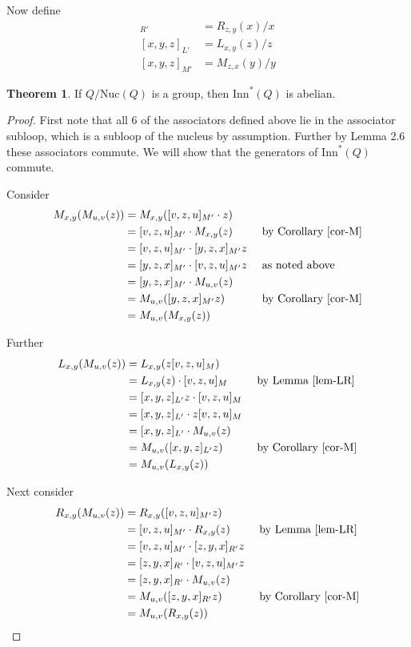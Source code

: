 \documentclass[12pt]{report}
\theoremstyle{definition}
\newtheorem{thm}{Theorem}[chapter]
\newcommand{\rdv}{/}                %
\newcommand{\nuc}{\text{Nuc}}       %
\newcommand{\inn}{\text{Inn}}       %
\begin{document}
Now define
  \begin{align*}
    [x, y, z]_{R'} &= R_{z, y}(x)\rdv x\\
    [x, y, z]_{L'} &= L_{x, y}(z)\rdv z\\
    [x, y, z]_{M'} &= M_{z, x}(y)\rdv y
  \end{align*}

\begin{thm}\label{inn*}
  If $Q/\nuc(Q)$ is a group, then $\inn^*(Q)$ is abelian.
\end{thm}

\begin{proof}
  First note that all 6 of the associators defined above lie in the associator subloop, which
    is a subloop of the nucleus by assumption. Further by \cite{PACC} Lemma 2.6 these associators
    commute. We will show that the generators of $\inn^*(Q)$ commute.

  Consider
  \begin{alignat*}{2}
    M_{x, y}(M_{u, v}(z)) &= M_{x, y}([v, z, u]_{M'}\cdot z) &&\\
    &= [v, z, u]_{M'}\cdot M_{x, y}(z) &&\text{ by Corollary \ref{cor-M}}\\
    &= [v, z, u]_{M'}\cdot [y, z, x]_{M'}z &&\\
    &= [y, z, x]_{M'}\cdot [v, z, u]_{M'}z &&\text{ as noted above}\\
    &= [y, z, x]_{M'}\cdot M_{u, v}(z) &&\\
    &= M_{u, v}([y, z, x]_{M'}z) &&\text{ by Corollary \ref{cor-M}}\\
    &= M_{u, v}(M_{x, y}(z))
  \end{alignat*}

  Further
  \begin{alignat*}{2}
    L_{x, y}(M_{u, v}(z)) &= L_{x, y}(z[v, z, u]_M) &&\\
    &= L_{x, y}(z)\cdot [v, z, u]_M &&\text{ by Lemma \ref{lem-LR}}\\
    &= [x, y, z]_{L'}z \cdot [v, z, u]_M &&\\
    &= [x, y, z]_{L'} \cdot z[v, z, u]_M &&\\
    &= [x, y, z]_{L'} \cdot M_{u, v}(z) &&\\
    &= M_{u, v}([x, y, z]_{L'} z) &&\text{ by Corollary \ref{cor-M}}\\
    &= M_{u, v}(L_{x, y}(z)) &&
  \end{alignat*}

  Next consider
  \begin{alignat*}{2}
    R_{x, y}(M_{u, v}(z)) &= R_{x, y}([v, z, u]_{M'}z) &&\\
    &= [v, z, u]_{M'}\cdot R_{x, y}(z) &&\text{ by Lemma \ref{lem-LR}}\\
    &= [v, z, u]_{M'}\cdot [z, y, x]_{R'}z &&\\
    &= [z, y, x]_{R'}\cdot [v, z, u]_{M'}z &&\\
    &= [z, y, x]_{R'}\cdot M_{u, v}(z) &&\\
    &= M_{u, v}([z, y, x]_{R'}z) &&\text{ by Corollary \ref{cor-M}}\\
    &= M_{u, v}(R_{x, y}(z)) &&
  \end{alignat*}


\end{proof}
\end{document}
